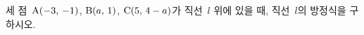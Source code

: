 세 점~$\mathrm{A}(-3,\mkern3mu -1)$, $\mathrm{B}(a,\mkern3mu 1)$, $\mathrm{C}(5,\mkern3mu 4-a)$가 직선~$l$ 위에 있을 때, 직선~$l$의 방정식을 구하시오.
